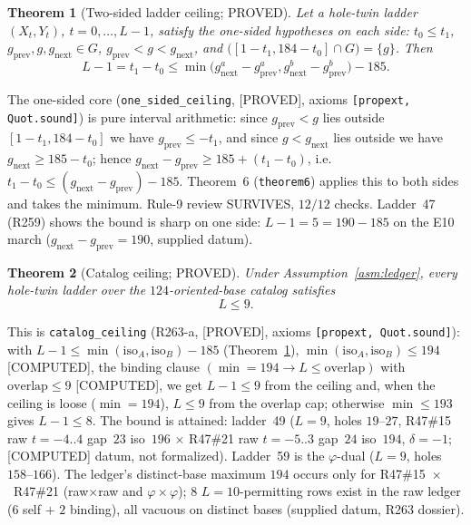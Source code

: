 \documentclass[11pt,a4paper]{article}
\newtheorem{theorem}{Theorem}
\theoremstyle{definition}
\begin{document}
\begin{theorem}[Two-sided ladder ceiling; PROVED]
  \label{thm:ladder6}
  Let a hole-twin ladder $(X_t,Y_t)$, $t=0,\dots,L-1$, satisfy the
  one-sided hypotheses on each side: $t_0\le t_1$,
  $g_{\mathrm{prev}},g,g_{\mathrm{next}}\in G$,
  $g_{\mathrm{prev}}<g<g_{\mathrm{next}}$, and
  $\bigl([1-t_1,184-t_0]\cap G\bigr)=\{g\}$. Then
  \begin{equation}
    \label{eq:ladder6}
    L-1=t_1-t_0\le
    \min\bigl(g^a_{\mathrm{next}}-g^a_{\mathrm{prev}},
              g^b_{\mathrm{next}}-g^b_{\mathrm{prev}}\bigr)-185.
  \end{equation}
\end{theorem}

The one-sided core (\texttt{one\_sided\_ceiling}, [PROVED], axioms
\texttt{[propext, Quot.sound]}) is pure interval arithmetic: since
$g_{\mathrm{prev}}<g$ lies outside $[1-t_1,184-t_0]$ we have
$g_{\mathrm{prev}}\le-t_1$, and since $g<g_{\mathrm{next}}$ lies outside
we have $g_{\mathrm{next}}\ge185-t_0$; hence
$g_{\mathrm{next}}-g_{\mathrm{prev}}\ge185+(t_1-t_0)$, i.e.\
$t_1-t_0\le(g_{\mathrm{next}}-g_{\mathrm{prev}})-185$. Theorem~6
(\texttt{theorem6}) applies this to both sides and takes the minimum.
Rule-9 review SURVIVES, $12/12$ checks. Ladder~47 (R259) shows the bound
is sharp on one side: $L-1=5=190-185$ on the E10 march ($g_{\mathrm{next}}
-g_{\mathrm{prev}}=190$, supplied datum).

\begin{theorem}[Catalog ceiling; PROVED]
  \label{thm:catalog}
  Under Assumption~\ref{asm:ledger}, every hole-twin ladder over the
  $124$-oriented-base catalog satisfies
  \begin{equation}
    \label{eq:catalog}
    L\le9.
  \end{equation}
\end{theorem}

This is \texttt{catalog\_ceiling} (R263-a, [PROVED], axioms
\texttt{[propext, Quot.sound]}): with $L-1\le\min(\mathrm{iso}_A,
\mathrm{iso}_B)-185$ (Theorem~\ref{thm:ladder6}), $\min(\mathrm{iso}_A,
\mathrm{iso}_B)\le194$ [COMPUTED], the binding clause
$(\min=194\to L\le\mathrm{overlap})$ with $\mathrm{overlap}\le9$
[COMPUTED], we get $L-1\le9$ from the ceiling and, when the ceiling is
loose ($\min=194$), $L\le9$ from the overlap cap; otherwise
$\min\le193$ gives $L-1\le8$. The bound is attained: ladder~49
($L=9$, holes $19$--$27$, R47\#15 raw $t=-4..4$ gap~$23$ iso~$196$
$\times$ R47\#21 raw $t=-5..3$ gap~$24$ iso~$194$, $\delta=-1$;
[COMPUTED] datum, not formalized). Ladder~59 is the $\varphi$-dual
($L=9$, holes $158$--$166$). The ledger's distinct-base maximum
$194$ occurs only for R47\#15~$\times$~R47\#21 (raw$\times$raw and
$\varphi\times\varphi$); $8$ $L{=}10$-permitting rows exist in the raw
ledger ($6$ self $+$ $2$ binding), all vacuous on distinct bases
(supplied datum, R263 dossier).
\end{document}
